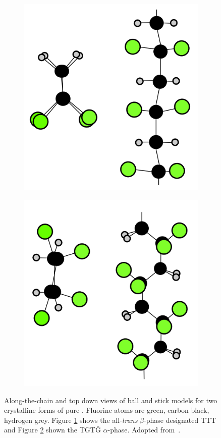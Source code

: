 \begin{figure}
\begin{subfigure}{0.5\textwidth}
\centering
	\includegraphics[width=0.8\linewidth]{./figs/chap1/pvdfbeta}
	\caption{}
	\label{fig:pvdfbeta}
\end{subfigure}
\begin{subfigure}{0.5\textwidth}
\centering
	\includegraphics[width=0.8\linewidth]{./figs/chap1/pvdfalpha}
	\caption{}
	\label{fig:pvdfalpha}
\end{subfigure}
\caption{Along-the-chain and top down views of ball and stick models for two crystalline forms of pure \pvdf{}. Fluorine atoms are green, carbon black, hydrogen grey. Figure \ref{fig:pvdfbeta} shows the all-\emph{trans} $\beta$-phase designated TTT and Figure \ref{fig:pvdfalpha} shown the TGT$\bar{\text{G}}$ $\alpha$-phase. Adopted from~\cite[p. 809]{encyclopedia}.}
\label{fig:pvdfstruct}
\end{figure}
